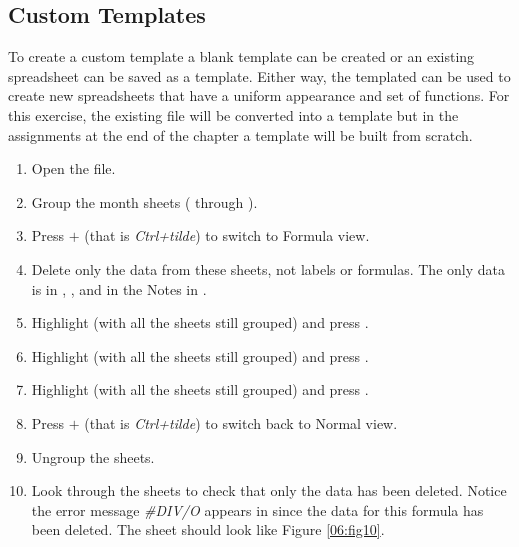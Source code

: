 \subsection{Custom Templates}

To create a custom template a blank template can be created or an existing spreadsheet can be saved as a template. Either way, the templated can be used to create new spreadsheets that have a uniform appearance and set of functions. For this exercise, the existing  file will be converted into a template but in the assignments at the end of the chapter a template will be built from scratch.

\begin{enumerate}
	\item Open the  file.
	\item Group the month sheets ( through ).
	\item Press $+$\fmtKeystroke{$ \sim $} (that is \textit{Ctrl+tilde}) to switch to Formula view.
	\item Delete only the data from these sheets, not labels or formulas. The only data is in , , and in the Notes in .
	\item Highlight  (with all the sheets still grouped) and press .
	\item Highlight  (with all the sheets still grouped) and press .
	\item Highlight  (with all the sheets still grouped) and press .
	\item Press $+$\fmtKeystroke{$ \sim $} (that is \textit{Ctrl+tilde}) to switch back to Normal view.
	\item Ungroup the sheets. 
	\item Look through the sheets to check that only the data has been deleted. Notice the error message \textit{\#DIV/O} appears in  since the data for this formula has been deleted. The  sheet should look like Figure \ref{06:fig10}.
\end{enumerate}

